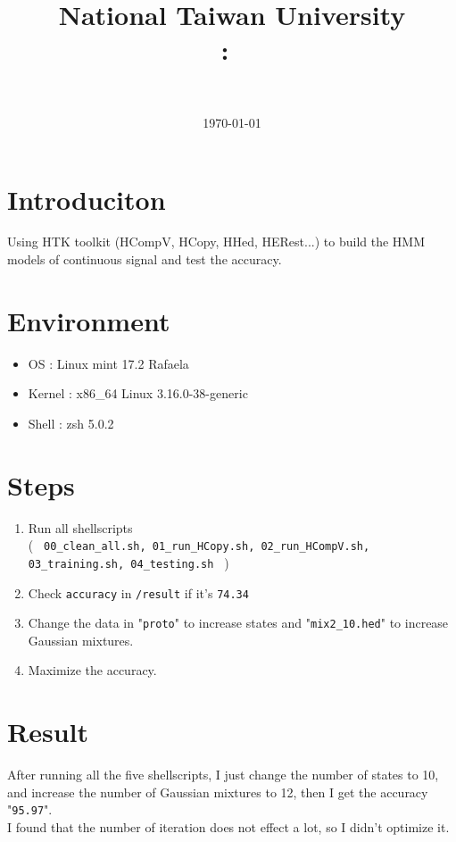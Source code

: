 \documentclass{article}
\title{
{National Taiwan University}\\    
    \textmd{\textbf{\Class:\ \Title}}
}
\author{
	\Department \ \AuthorID \\
	\textbf{\AuthorName}
}
\date{
	\today \\
	\horline{1pt}
}
\newcommand\n{\mbox{\qquad}}
\begin{document}
\maketitle
\section{Introduciton}
\n Using HTK toolkit (HCompV, HCopy, HHed, HERest...) to build the HMM models of continuous signal and test the accuracy. 

\section{Environment}
\begin{itemize}
	\item OS : Linux mint 17.2 Rafaela
	\item Kernel : x86\_64 Linux 3.16.0-38-generic
	\item Shell : zsh 5.0.2
\end{itemize}

\section{Steps}
\begin{enumerate}
	\item Run all shellscripts \\(
		\texttt{
			 00\_clean\_all.sh,
			 01\_run\_HCopy.sh,
			 02\_run\_HCompV.sh,
			 03\_training.sh,
			 04\_testing.sh
		} )
	\item Check \texttt{accuracy} in \texttt{/result} if it's \texttt{74.34}
	\item Change the data in "\texttt{proto}" to increase states and
		"\texttt{mix2\_10.hed}" to increase Gaussian mixtures.
	\item Maximize the accuracy.
\end{enumerate}

\section{Result}
\n After running all the five shellscripts, I just change the number of states to 10, and increase the number of Gaussian mixtures to 12, then I get the accuracy "\texttt{95.97}".
\\
\n I found that the number of iteration does not effect a lot, so I didn't optimize it.
\end{document}
